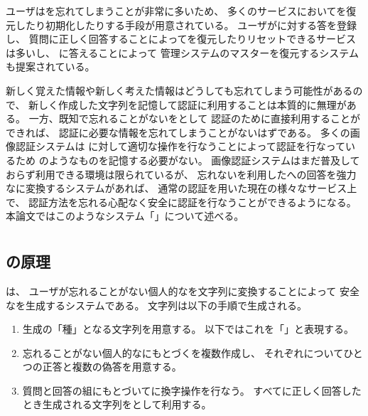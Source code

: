 \documentclass[twoside]{wiss}
\begin{document}
ユーザは{\PW}を忘れてしまうことが非常に多いため、
多くのサービスにおいて{\PW}を復元したり初期化したりする手段が用意されている。
ユーザが{\SQ}に対する答を登録し、
質問に正しく回答することによって{\PW}を復元したりリセットできるサービスは多いし、
{\SQ}に答えることによって
{\PW}管理システムのマスター{\PW}を復元するシステム\cite{平野亮:2011-11-07}も提案されている。

新しく覚えた情報や新しく考えた情報はどうしても忘れてしまう可能性があるので、
新しく作成した{\PW}文字列を記憶して認証に利用することは本質的に無理がある。
一方、既知で忘れることがない{\EM}を{\SQ}として
認証のために直接利用することができれば、
認証に必要な情報を忘れてしまうことがないはずである。
多くの画像認証システム\cite{Biddle:2012:GPL:2333112.2333114}\cite{小池英樹:2006-05-15}\cite{GraphicalPasswords}は
{\SQ}に対して適切な操作を行なうことによって認証を行なっているため
{\PW}のようなものを記憶する必要がない。
%
画像認証システムはまだ普及しておらず利用できる環境は限られているが、
忘れない{\EM}を利用した{\SQ}への回答を強力な{\PW}に変換するシステムがあれば、
通常の{\PW}認証を用いた現在の様々なサービス上で、
認証方法を忘れる心配なく安全に認証を行なうことができるようになる。
本論文ではこのようなシステム「{\EP}」について述べる。

\section{{\EP}}

\subsection{{\EP}の原理}

{\EP}は、
ユーザが忘れることがない個人的な{\EM}を文字列に変換することによって
安全な{\PW}を生成するシステムである。
{\PW}文字列は以下の手順で生成される。

\begin{enumerate}
\item {\PW}生成の「種」となる文字列を用意する。
以下ではこれを「{\SS}」と表現する。
\item 忘れることがない個人的な{\EM}にもとづく{\SQ}を複数作成し、
それぞれについてひとつの正答と複数の偽答を用意する。
\item 質問と回答の組にもとづいて{\SS}に換字操作を行なう。
すべてに正しく回答したとき生成される文字列を{\PW}として利用する。
\end{enumerate}
\end{document}
